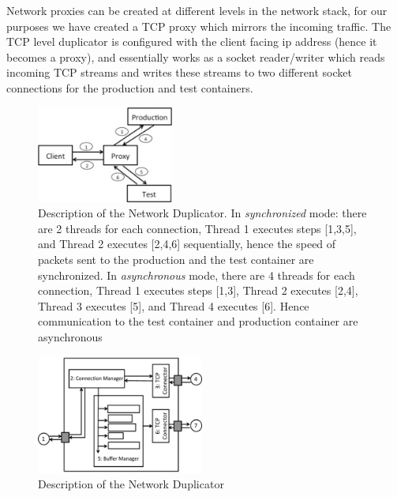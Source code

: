 Network proxies can be created at different levels in the network stack, for our purposes we have created a TCP proxy which mirrors the incoming traffic.
The TCP level duplicator is configured with the client facing ip address (hence it becomes a proxy), and essentially works as a socket reader/writer which reads incoming TCP streams and writes these streams to two different socket connections for the production and test containers.

\begin{figure}[t]
  \begin{center}
    \includegraphics[width=0.4\textwidth]{figs/network_dup.eps}
    \caption{Description of the Network Duplicator. In \textit{synchronized} mode: there are 2 threads for each connection, Thread 1 executes steps [1,3,5], and Thread 2 executes [2,4,6] sequentially, hence the speed of packets sent to the production and the test container are synchronized. In \textit{asynchronous} mode, there are 4 threads for each connection, Thread 1 executes steps [1,3], Thread 2 executes [2,4], Thread 3 executes [5], and Thread 4 executes [6]. Hence communication to the test container and production container are asynchronous}
    \label{fig:duplicator}
  \end{center}
\end{figure}


\iffalse

\begin{figure}[t]
  \begin{center}
    \includegraphics[width=0.49\textwidth]{figs/duplicator.eps}
    \caption{Description of the Network Duplicator}
    \label{fig:duplicator}
  \end{center}
\end{figure}

